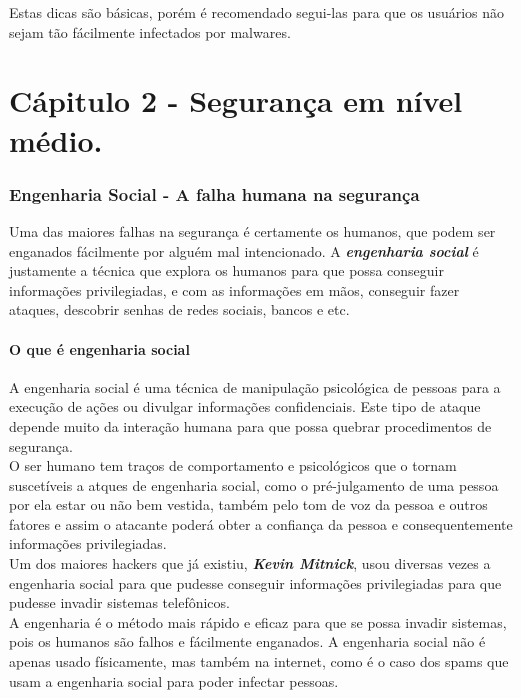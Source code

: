\documentclass[12pt, letterpaper]{report}
\begin{document}
	Estas dicas são básicas, porém é recomendado segui-las para que os usuários não sejam tão fácilmente infectados por malwares.\\

\pagebreak

\part{Cápitulo 2 - Segurança em nível médio.}

\section*{Engenharia Social - A falha humana na segurança}
	Uma das maiores falhas na segurança é certamente os humanos, que podem ser enganados fácilmente por alguém mal intencionado. A \textbf{\textit{engenharia social}} é justamente a técnica que explora os humanos para que possa conseguir informações privilegiadas, e com as informações em mãos, conseguir fazer ataques, descobrir senhas de redes sociais, bancos e etc.\\

\subsection{O que é engenharia social}
	A engenharia social é uma técnica de manipulação psicológica de pessoas para a execução de ações ou divulgar informações confidenciais. Este tipo de ataque depende muito da interação humana para que possa quebrar procedimentos de segurança.\\
	O ser humano tem traços de comportamento e psicológicos que o tornam suscetíveis a atques de engenharia social, como o pré-julgamento de uma pessoa por ela estar ou não bem vestida, também pelo tom de voz da pessoa e outros fatores e assim o atacante poderá obter a confiança da pessoa e consequentemente informações privilegiadas.\\

	Um dos maiores hackers que já existiu, \textbf{\textit{Kevin Mitnick}}, usou diversas vezes a engenharia social para que pudesse conseguir informações privilegiadas para que pudesse invadir sistemas telefônicos.\\

	A engenharia é o método mais rápido e eficaz para que se possa invadir sistemas, pois os humanos são falhos e fácilmente enganados. A engenharia social não é apenas usado físicamente, mas também na internet, como é o caso dos spams que usam a engenharia social para poder infectar pessoas.\\
\end{document}
